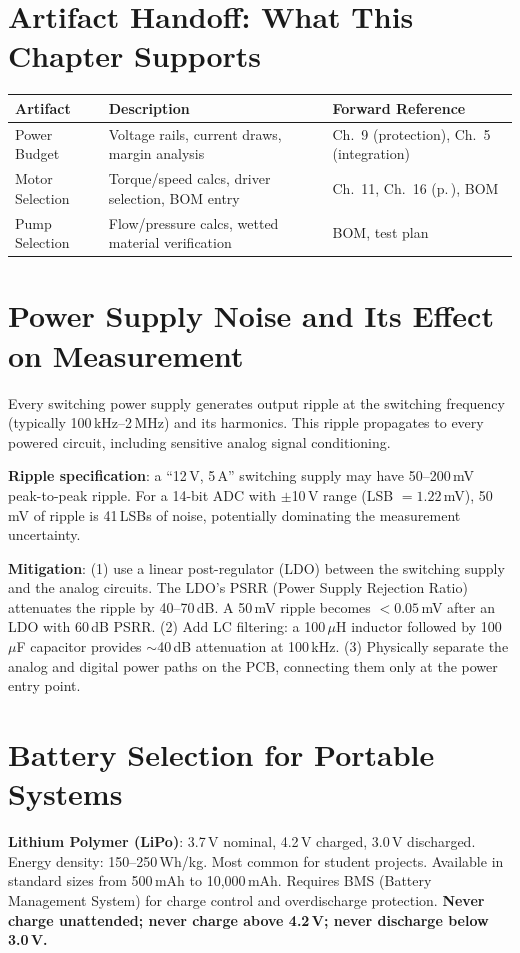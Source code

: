 \section{Artifact Handoff: What This Chapter Supports}
\begin{table}[htbp]\centering\small
\begin{tabularx}{\textwidth}{l X l}
\toprule
\textbf{Artifact} & \textbf{Description} & \textbf{Forward Reference} \\
\midrule
Power Budget & Voltage rails, current draws, margin analysis & Ch.~9 (protection), Ch.~5 (integration) \\
Motor Selection & Torque/speed calcs, driver selection, BOM entry & Ch.~11, Ch.~16 (p.\,\pageref{ch:transmission}), BOM \\
Pump Selection & Flow/pressure calcs, wetted material verification & BOM, test plan \\
\bottomrule
\end{tabularx}
\end{table}

\section{Power Supply Noise and Its Effect on Measurement}
Every switching power supply generates output ripple at the switching frequency (typically 100\,kHz--2\,MHz) and its harmonics. This ripple propagates to every powered circuit, including sensitive analog signal conditioning.

\textbf{Ripple specification}: a ``12\,V, 5\,A'' switching supply may have 50--200\,mV peak-to-peak ripple. For a 14-bit ADC with $\pm$10\,V range (LSB $= 1.22$\,mV), 50\,mV of ripple is 41\,LSBs of noise, potentially dominating the measurement uncertainty.

\textbf{Mitigation}: (1) use a linear post-regulator (LDO) between the switching supply and the analog circuits. The LDO's PSRR (Power Supply Rejection Ratio) attenuates the ripple by 40--70\,dB. A 50\,mV ripple becomes $< 0.05$\,mV after an LDO with 60\,dB PSRR. (2) Add LC filtering: a 100\,$\mu$H inductor followed by 100\,$\mu$F capacitor provides $\sim$40\,dB attenuation at 100\,kHz. (3) Physically separate the analog and digital power paths on the PCB, connecting them only at the power entry point.

\section{Battery Selection for Portable Systems}
\textbf{Lithium Polymer (LiPo)}: 3.7\,V nominal, 4.2\,V charged, 3.0\,V discharged. Energy density: 150--250\,Wh/kg. Most common for student projects. Available in standard sizes from 500\,mAh to 10{,}000\,mAh. Requires BMS (Battery Management System) for charge control and overdischarge protection. \textbf{Never charge unattended; never charge above 4.2\,V; never discharge below 3.0\,V.}

